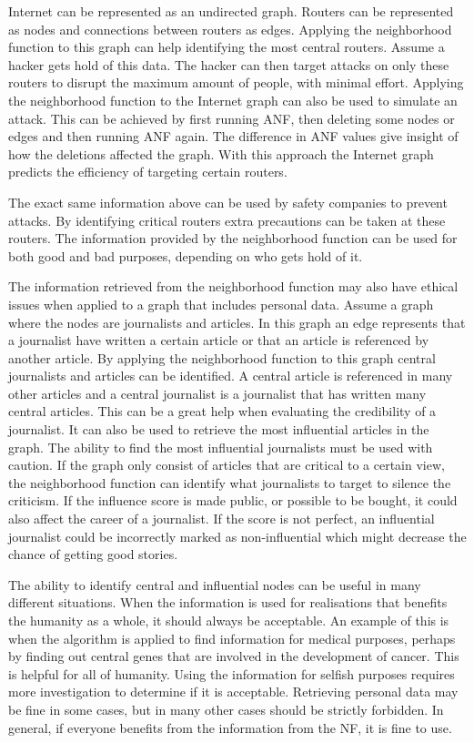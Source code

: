 Internet can be represented as an undirected graph. Routers can be represented as nodes and connections between routers as edges. Applying the neighborhood function to this graph can help identifying the most central routers. Assume a hacker gets hold of this data. The hacker can then target attacks on only these routers to disrupt the maximum amount of people, with minimal effort. Applying the neighborhood function to the Internet graph can also be used to simulate an attack. This can be achieved by first running ANF, then deleting some nodes or edges and then running ANF again. The difference in ANF values give insight of how the deletions affected the graph. With this approach the Internet graph predicts the efficiency of targeting certain routers. 

The exact same information above can be used by safety companies to prevent attacks. By identifying critical routers extra precautions can be taken at these routers. The information provided by the neighborhood function can be used for both good and bad purposes, depending on who gets hold of it.

The information retrieved from the neighborhood function may also have ethical issues when applied to a graph that includes personal data. Assume a graph where the nodes are journalists and articles. In this graph an edge represents that a journalist have written a certain article or that an article is referenced by another article. By applying the neighborhood function to this graph central journalists and articles can be identified. A central article is referenced in many other articles and a central journalist is a journalist that has written many central articles. This can be a great help when evaluating the credibility of a journalist. It can also be used to retrieve the most influential articles in the graph. The ability to find the most influential journalists must be used with caution. If the graph only consist of articles that are critical to a certain view, the neighborhood function can identify what journalists to target to silence the criticism. If the influence score is made public, or possible to be bought, it could also affect the career of a journalist. If the score is not perfect, an influential journalist could be incorrectly marked as non-influential which might decrease the chance of getting good stories.

The ability to identify central and influential nodes can be useful in many different situations. When the information is used for realisations that benefits the humanity as a whole, it should always be acceptable. An example of this is when the algorithm is applied to find information for medical purposes, perhaps by finding out central genes that are involved in the development of cancer. This is helpful for all of humanity. Using the information for selfish purposes requires more investigation to determine if it is acceptable. Retrieving personal data may be fine in some cases, but in many other cases should be strictly forbidden. In general, if everyone benefits from the information from the NF, it is fine to use.
 
